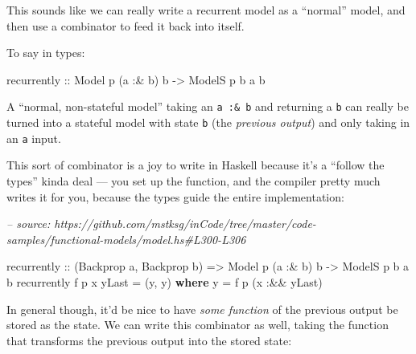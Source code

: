 \documentclass[]{article}
\newenvironment{Shaded}{}{}
\newcommand{\CommentTok}[1]{\textcolor[rgb]{0.38,0.63,0.69}{\textit{#1}}}
\newcommand{\DataTypeTok}[1]{\textcolor[rgb]{0.56,0.13,0.00}{#1}}
\newcommand{\FunctionTok}[1]{\textcolor[rgb]{0.02,0.16,0.49}{#1}}
\newcommand{\KeywordTok}[1]{\textcolor[rgb]{0.00,0.44,0.13}{\textbf{#1}}}
\newcommand{\NormalTok}[1]{#1}
\newcommand{\OtherTok}[1]{\textcolor[rgb]{0.00,0.44,0.13}{#1}}
\begin{document}
This sounds like we can really write a recurrent model as a ``normal'' model,
and then use a combinator to feed it back into itself.

To say in types:

\begin{Shaded}
\begin{Highlighting}[]
\NormalTok{recurrently}
\OtherTok{    ::} \DataTypeTok{Model}\NormalTok{  p   (a }\FunctionTok{:&}\NormalTok{ b) b}
    \OtherTok{->} \DataTypeTok{ModelS}\NormalTok{ p b  a       b}
\end{Highlighting}
\end{Shaded}

A ``normal, non-stateful model'' taking an \texttt{a\ :\&\ b} and returning a
\texttt{b} can really be turned into a stateful model with state \texttt{b} (the
\emph{previous output}) and only taking in an \texttt{a} input.

This sort of combinator is a joy to write in Haskell because it's a ``follow the
types'' kinda deal --- you set up the function, and the compiler pretty much
writes it for you, because the types guide the entire implementation:

\begin{Shaded}
\begin{Highlighting}[]
\CommentTok{-- source: https://github.com/mstksg/inCode/tree/master/code-samples/functional-models/model.hs#L300-L306}

\NormalTok{recurrently}
\OtherTok{    ::}\NormalTok{ (}\DataTypeTok{Backprop}\NormalTok{ a, }\DataTypeTok{Backprop}\NormalTok{ b)}
    \OtherTok{=>} \DataTypeTok{Model}\NormalTok{  p   (a }\FunctionTok{:&}\NormalTok{ b) b}
    \OtherTok{->} \DataTypeTok{ModelS}\NormalTok{ p b  a       b}
\NormalTok{recurrently f p x yLast }\FunctionTok{=}\NormalTok{ (y, y)}
  \KeywordTok{where}
\NormalTok{    y }\FunctionTok{=}\NormalTok{ f p (x }\FunctionTok{:&&}\NormalTok{ yLast)}
\end{Highlighting}
\end{Shaded}

In general though, it'd be nice to have \emph{some function} of the previous
output be stored as the state. We can write this combinator as well, taking the
function that transforms the previous output into the stored state:
\end{document}
